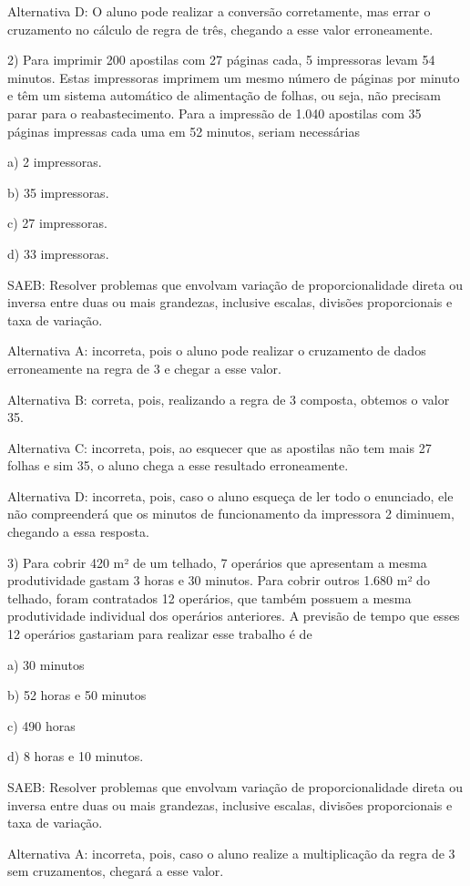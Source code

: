 Alternativa D: O aluno pode realizar a conversão corretamente, mas errar
o cruzamento no cálculo de regra de três, chegando a esse valor
erroneamente.

2) Para imprimir 200 apostilas com 27 páginas cada, 5 impressoras levam
54 minutos. Estas impressoras imprimem um mesmo número de páginas por
minuto e têm um sistema automático de alimentação de folhas, ou seja,
não precisam parar para o reabastecimento. Para a impressão de 1.040
apostilas com 35 páginas impressas cada uma em 52 minutos, seriam
necessárias

a) 2 impressoras.

b) 35 impressoras.

c) 27 impressoras.

d) 33 impressoras.

SAEB: Resolver problemas que envolvam variação de proporcionalidade
direta ou inversa entre duas ou mais grandezas, inclusive escalas,
divisões proporcionais e taxa de variação.

Alternativa A: incorreta, pois o aluno pode realizar o cruzamento de
dados erroneamente na regra de 3 e chegar a esse valor.

Alternativa B: correta, pois, realizando a regra de 3 composta, obtemos
o valor 35.

Alternativa C: incorreta, pois, ao esquecer que as apostilas não tem
mais 27 folhas e sim 35, o aluno chega a esse resultado erroneamente.

Alternativa D: incorreta, pois, caso o aluno esqueça de ler todo o
enunciado, ele não compreenderá que os minutos de funcionamento da
impressora 2 diminuem, chegando a essa resposta.

3) Para cobrir 420 m² de um telhado, 7 operários que apresentam a mesma
produtividade gastam 3 horas e 30 minutos. Para cobrir outros 1.680 m²
do telhado, foram contratados 12 operários, que também possuem a mesma
produtividade individual dos operários anteriores. A previsão de tempo
que esses 12 operários gastariam para realizar esse trabalho é de

a) 30 minutos

b) 52 horas e 50 minutos

c) 490 horas

d) 8 horas e 10 minutos.

SAEB: Resolver problemas que envolvam variação de proporcionalidade
direta ou inversa entre duas ou mais grandezas, inclusive escalas,
divisões proporcionais e taxa de variação.

Alternativa A: incorreta, pois, caso o aluno realize a multiplicação da
regra de 3 sem cruzamentos, chegará a esse valor.

